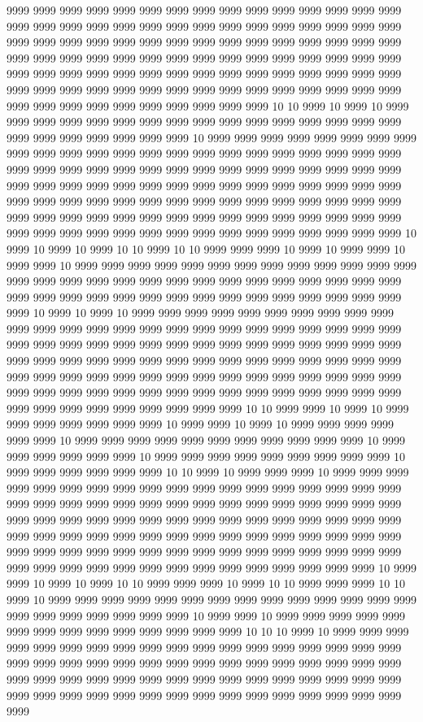 9999 9999 9999 9999 9999 9999 9999 9999 9999 9999 9999 9999 9999 9999 9999 9999 9999 9999 9999 9999 9999 9999 9999 9999 9999 9999 9999 9999 9999 9999 9999 9999 9999 9999 9999 9999 9999 9999 9999 9999 9999 9999 9999 9999 9999 9999 9999 9999 9999 9999 9999 9999 9999 9999 9999 9999 9999 9999 9999 9999 9999 9999 9999 9999 9999 9999 9999 9999 9999 9999 9999 9999 9999 9999 9999 9999 9999 9999 9999 9999 9999 9999 9999 9999 9999 9999 9999 9999 9999 9999 9999 9999 9999 9999 9999 9999 9999 9999 9999 9999 10 10 9999 10 9999 10 9999 9999 9999 9999 9999 9999 9999 9999 9999 9999 9999 9999 9999 9999 9999 9999 9999 9999 9999 9999 9999 9999 9999 10 9999 9999 9999 9999 9999 9999 9999 9999 9999 9999 9999 9999 9999 9999 9999 9999 9999 9999 9999 9999 9999 9999 9999 9999 9999 9999 9999 9999 9999 9999 9999 9999 9999 9999 9999 9999 9999 9999 9999 9999 9999 9999 9999 9999 9999 9999 9999 9999 9999 9999 9999 9999 9999 9999 9999 9999 9999 9999 9999 9999 9999 9999 9999 9999 9999 9999 9999 9999 9999 9999 9999 9999 9999 9999 9999 9999 9999 9999 9999 9999 9999 9999 9999 9999 9999 9999 9999 9999 9999 9999 9999 9999 9999 9999 9999 9999 9999 9999 10 9999 10 9999 10 9999 10 10 9999 10 10 9999 9999 9999 10 9999 10 9999 9999 10 9999 9999 10 9999 9999 9999 9999 9999 9999 9999 9999 9999 9999 9999 9999 9999 9999 9999 9999 9999 9999 9999 9999 9999 9999 9999 9999 9999 9999 9999 9999 9999 9999 9999 9999 9999 9999 9999 9999 9999 9999 9999 9999 9999 9999 9999 9999 10 9999 10 9999 10 9999 9999 9999 9999 9999 9999 9999 9999 9999 9999 9999 9999 9999 9999 9999 9999 9999 9999 9999 9999 9999 9999 9999 9999 9999 9999 9999 9999 9999 9999 9999 9999 9999 9999 9999 9999 9999 9999 9999 9999 9999 9999 9999 9999 9999 9999 9999 9999 9999 9999 9999 9999 9999 9999 9999 9999 9999 9999 9999 9999 9999 9999 9999 9999 9999 9999 9999 9999 9999 9999 9999 9999 9999 9999 9999 9999 9999 9999 9999 9999 9999 9999 9999 9999 9999 9999 9999 9999 9999 9999 9999 9999 9999 9999 10 10 9999 9999 10 9999 10 9999 9999 9999 9999 9999 9999 9999 10 9999 9999 10 9999 10 9999 9999 9999 9999 9999 9999 10 9999 9999 9999 9999 9999 9999 9999 9999 9999 9999 9999 10 9999 9999 9999 9999 9999 9999 10 9999 9999 9999 9999 9999 9999 9999 9999 9999 10 9999 9999 9999 9999 9999 9999 10 10 9999 10 9999 9999 9999 10 9999 9999 9999 9999 9999 9999 9999 9999 9999 9999 9999 9999 9999 9999 9999 9999 9999 9999 9999 9999 9999 9999 9999 9999 9999 9999 9999 9999 9999 9999 9999 9999 9999 9999 9999 9999 9999 9999 9999 9999 9999 9999 9999 9999 9999 9999 9999 9999 9999 9999 9999 9999 9999 9999 9999 9999 9999 9999 9999 9999 9999 9999 9999 9999 9999 9999 9999 9999 9999 9999 9999 9999 9999 9999 9999 9999 9999 9999 9999 9999 9999 9999 9999 9999 9999 9999 9999 9999 9999 9999 9999 9999 10 9999 9999 10 9999 10 9999 10 10 9999 9999 9999 10 9999 10 10 9999 9999 9999 10 10 9999 10 9999 9999 9999 9999 9999 9999 9999 9999 9999 9999 9999 9999 9999 9999 9999 9999 9999 9999 9999 9999 9999 10 9999 9999 10 9999 9999 9999 9999 9999 9999 9999 9999 9999 9999 9999 9999 9999 9999 10 10 10 9999 10 9999 9999 9999 9999 9999 9999 9999 9999 9999 9999 9999 9999 9999 9999 9999 9999 9999 9999 9999 9999 9999 9999 9999 9999 9999 9999 9999 9999 9999 9999 9999 9999 9999 9999 9999 9999 9999 9999 9999 9999 9999 9999 9999 9999 9999 9999 9999 9999 9999 9999 9999 9999 9999 9999 9999 9999 9999 9999 9999 9999 9999 9999 9999 9999 